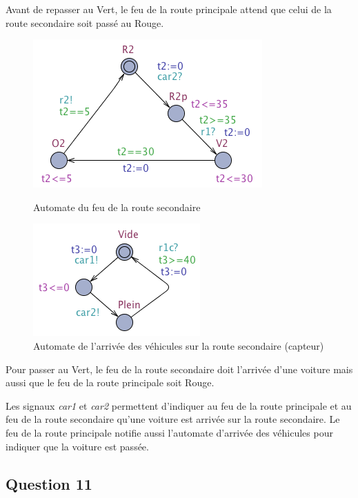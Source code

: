 \documentclass[11pt]{article}
\begin{document}
Avant de repasser au Vert, le feu de la route principale attend que celui de la route secondaire soit passé au Rouge.

\begin{figure}[H]
    \begin{minipage}[c]{.46\linewidth}
		\centering
		\includegraphics[scale=0.5]{ressources/part3/Q10-2.png}
		\caption{Automate du feu de la route secondaire}
    \end{minipage}
    \hfill%
    \begin{minipage}[c]{.46\linewidth}
		\centering
		\includegraphics[scale=0.5]{ressources/part3/Q10-3.png}
		\caption{Automate de l'arrivée des véhicules sur la route secondaire (capteur)}
    \end{minipage}
\end{figure}

Pour passer au Vert, le feu de la route secondaire doit l'arrivée d'une voiture mais aussi que le feu de la route principale soit Rouge.

Les signaux \emph{car1} et \emph{car2} permettent d'indiquer au feu de la route principale et au feu de la route secondaire qu'une voiture est arrivée sur la route secondaire. Le feu de la route principale notifie aussi l'automate d'arrivée des véhicules pour indiquer que la voiture est passée.

\subsection{Question 11}
\end{document}
